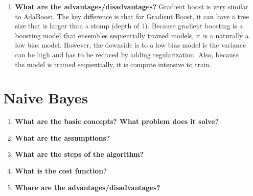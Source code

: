 \documentclass{article}
\begin{document}
\begin{enumerate}
    \item \textbf{What are the advantages/disadvantages?}
    \noindent 
    \smallbreak
    Gradient boost is very similar to AdaBoost. The key difference is that for Gradient Boost, it can have a tree size that is larger than a stomp (depth of 1). Because gradient boosting is a boosting model that ensembles sequentially trained models, it is a naturally a low bias model. However, the downside is to a low bias model is the variance can be high and has to be reduced by adding regularization. Also, because the model is trained sequentially, it is compute intensive to train.
    
\end{enumerate}

\section{Naive Bayes}

\noindent
\begin{enumerate}
    \item \textbf{What are the basic concepts? What problem does it solve?}
    \noindent 
    \smallbreak
    
    
    \item \textbf{What are the assumptions?}
    \noindent 
    \smallbreak
    
    
    \item \textbf{What are the steps of the algorithm?}
    \noindent 
    \smallbreak
    
    
    \item \textbf{What is the cost function?}
    \noindent 
    \smallbreak
    
    
    \item \textbf{Whare are the advantages/disadvantages?}
    \noindent 
    \smallbreak
    
    
\end{enumerate}
\end{document}
